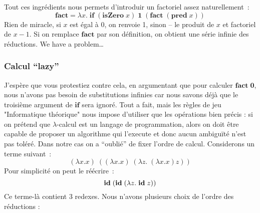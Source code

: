 \subsubsection*{}
Tout ces ingrédients nous permets d'introduir un factoriel assez naturellement~:
$$\mathbf{fact} = \lambda x. \; \mathbf{if} \; (\mathbf{isZero} \; x) \; \mathbf{1} \; (\mathbf{fact} \; (\mathbf{pred} \; x))$$
Rien de miracle, si $x$ est égal à 0, on renvoie 1, sinon -- le produit de $x$ et factoriel de $x-1$.
Si on remplace $\mathbf{fact}$ par son définition, on obtient une série infinie des réductions. We have a problem\ldots

\subsubsection*{Calcul ``lazy''}
J'espère que vous protestiez contre cela, en argumentant que pour calculer $\mathbf{fact\;0}$, nous n'avons pas besoin de substitutions infinies car nous savons déjà que le troisième argument de $\mathbf{if}$ sera ignoré.
Tout a fait, mais les règles de jeu "Informatique théorique" nous impose d'utiliser que les opérations bien précis : si on prétend que $\lambda$-calcul est un langage de programmation, alors on doit être capable de proposer un algorithme qui l'execute et donc aucun ambiguïté n'est pas toléré.
Dans notre cas on a ``oublié'' de fixer l'ordre de calcul.
Considerons un terme suivant~:
$$(\lambda x.x) \; ((\lambda x.x) \; (\lambda z. \; (\lambda x.x) z))$$
Pour simplicité on peut le réécrire~:
$$\mathbf{id} \; (\mathbf{id} \; (\lambda z. \; \mathbf{id} \; z))$$
Ce terme-là contient 3 redexes. Nous n'avons plusieurs choix de l'ordre des réductions :
